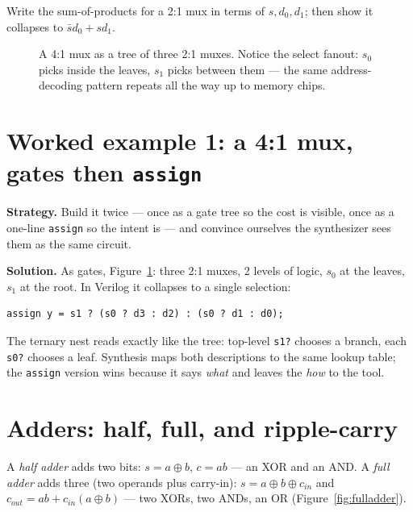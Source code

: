 \begin{exercise}[easy]
Write the sum-of-products for a 2:1 mux in terms of $s, d_0, d_1$; then
show it collapses to $\bar s d_0 + s d_1$.
\end{exercise}

\begin{figure}[htbp]
\centering

\caption{A 4:1 mux as a tree of three 2:1 muxes. Notice the select fanout:
$s_0$ picks inside the leaves, $s_1$ picks between them — the same
address-decoding pattern repeats all the way up to memory chips.}
\label{fig:muxtree}
\end{figure}

\section{Worked example 1: a 4:1 mux, gates then \texttt{assign}}
\label{sec:we-mux}

\textbf{Strategy.} Build it twice — once as a gate tree so the cost is
visible, once as a one-line \texttt{assign} so the intent is — and
convince ourselves the synthesizer sees them as the same circuit.

\textbf{Solution.} As gates, Figure~\ref{fig:muxtree}: three 2:1 muxes,
2 levels of logic, $s_0$ at the leaves, $s_1$ at the root. In Verilog it
collapses to a single selection:
\begin{lstlisting}[caption={The same 4:1 mux as one \texttt{assign}
--- read-only here; toolchain formalised in ch11.},abovecaptionskip=0pt]
assign y = s1 ? (s0 ? d3 : d2) : (s0 ? d1 : d0);
\end{lstlisting}
The ternary nest reads exactly like the tree: top-level \texttt{s1?}
chooses a branch, each \texttt{s0?} chooses a leaf. Synthesis maps both
descriptions to the same lookup table; the \texttt{assign} version wins
because it says \emph{what} and leaves the \emph{how} to the tool.

\section{Adders: half, full, and ripple-carry}
\label{sec:adders}

A \emph{half adder} adds two bits: $s=a\oplus b$,
$c=ab$ — an XOR and an AND. A \emph{full adder} adds
three (two operands plus carry-in):
$s=a\oplus b\oplus c_{in}$ and $c_{out}=ab+c_{in}(a\oplus b)$ — two XORs,
two ANDs, an OR (Figure~\ref{fig:fulladder}).

